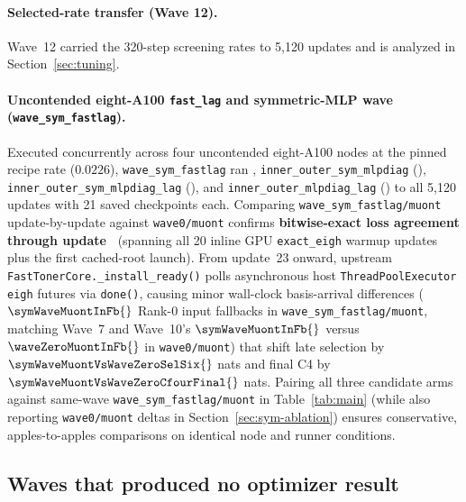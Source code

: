 \paragraph{Selected-rate transfer (Wave 12).}
Wave~12 carried the 320-step screening rates to 5{,}120 updates and is analyzed
in Section~\ref{sec:tuning}.

\paragraph{Uncontended eight-A100 \texttt{fast\_lag} and symmetric-MLP wave (\texttt{wave\_sym\_fastlag}).}
Executed concurrently across four uncontended eight-A100 nodes at the pinned
recipe rate ($0.0226$), \texttt{wave\_\allowbreak sym\_\allowbreak fastlag} ran
\muont{}, \texttt{inner\_\allowbreak outer\_\allowbreak sym\_\allowbreak mlpdiag}
(),
\texttt{inner\_\allowbreak outer\_\allowbreak sym\_\allowbreak mlp\allowbreak diag\_\allowbreak lag}
(), and
\texttt{inner\_\allowbreak outer\_\allowbreak mlpdiag\_\allowbreak lag}
() to all 5{,}120 updates with 21 saved checkpoints each.
Comparing \texttt{wave\_\allowbreak sym\_\allowbreak fastlag/\allowbreak muont} update-by-update against
\texttt{wave0/\allowbreak muont} confirms \textbf{bitwise-exact loss agreement through
update~\symWaveExactSteps{}} (spanning all 20 inline GPU \texttt{exact\_eigh}
warmup updates plus the first cached-root launch). From update~23 onward,
upstream \texttt{FastTonerCore.\allowbreak\_install\_ready()} polls asynchronous
host \texttt{ThreadPoolExecutor} \texttt{eigh} futures via \texttt{done()},
causing minor wall-clock basis-arrival differences ($\symWaveMuontInFb{}$ Rank-0
input fallbacks in \texttt{wave\_sym\_fastlag/\allowbreak muont}, matching Wave~7
and Wave~10's $\symWaveMuontInFb{}$ versus $\waveZeroMuontInFb{}$ in
\texttt{wave0/muont}) that shift late selection by $\symWaveMuontVsWaveZeroSelSix{}$
nats and final C4 by $\symWaveMuontVsWaveZeroCfourFinal{}$ nats. Pairing all three
candidate arms against same-wave \texttt{wave\_sym\_fastlag/\allowbreak muont} in
Table~\ref{tab:main} (while also reporting \texttt{wave0/muont} deltas in
Section~\ref{sec:sym-ablation}) ensures conservative, apples-to-apples comparisons
on identical node and runner conditions.

\subsection{Waves that produced no optimizer result}

